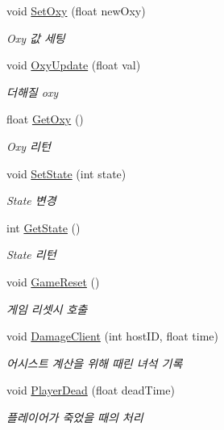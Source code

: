 \begin{DoxyCompactItemize}
void \hyperlink{class_room_client_a2e18fdd17364dc295fd0bd6da61e3727}{Set\+Oxy} (float new\+Oxy)
\begin{DoxyCompactList}\small\item\em Oxy 값 세팅 \end{DoxyCompactList}\item 
void \hyperlink{class_room_client_afa031772ae59a775b4f4a5d8981aabb6}{Oxy\+Update} (float val)
\begin{DoxyCompactList}\small\item\em 더해질 oxy \end{DoxyCompactList}\item 
float \hyperlink{class_room_client_a5d43788e44e43ddf5ac897195ab2d977}{Get\+Oxy} ()
\begin{DoxyCompactList}\small\item\em Oxy 리턴 \end{DoxyCompactList}\item 
void \hyperlink{class_room_client_a2391082059ef2e5148ba9e74baf6259e}{Set\+State} (int state)
\begin{DoxyCompactList}\small\item\em State 변경 \end{DoxyCompactList}\item 
int \hyperlink{class_room_client_a813a45c92f0d6869546539093ab5c18a}{Get\+State} ()
\begin{DoxyCompactList}\small\item\em State 리턴 \end{DoxyCompactList}\item 
void \hyperlink{class_room_client_a0ba33e4df82c58b4d7f8278daefc6bd9}{Game\+Reset} ()
\begin{DoxyCompactList}\small\item\em 게임 리셋시 호출 \end{DoxyCompactList}\item 
void \hyperlink{class_room_client_a16bae0bd06c33e1f96b5a3ac675db567}{Damage\+Client} (int host\+ID, float time)
\begin{DoxyCompactList}\small\item\em 어시스트 계산을 위해 때린 녀석 기록 \end{DoxyCompactList}\item 
void \hyperlink{class_room_client_aa1914f4585c26f5073c3f8639d38aa41}{Player\+Dead} (float dead\+Time)
\begin{DoxyCompactList}\small\item\em 플레이어가 죽었을 때의 처리 \end{DoxyCompactList}\item 

\end{DoxyCompactItemize}

